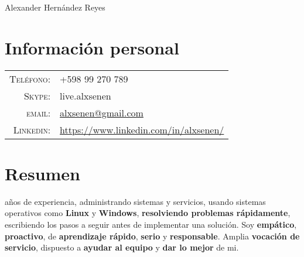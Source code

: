 \documentclass[a4paper,10pt]{article}
\begin{document}
\vspace*{-0.5cm}

\pagestyle{empty} %

{\huge Alexander Hern\'andez Reyes}
\hfill
{}\\
\section{Informaci\'on personal}
\begin{tabular}{rl}
    \textsc{Tel\'efono:}     & +598 99 270 789 \\
    \textsc{Skype:}     & live.alxsenen \\
    \textsc{email:}     & \href{mailto:alxsenen@gmail.com}{alxsenen@gmail.com} \\
    \textsc{Linkedin:}     & \href{https://www.linkedin.com/in/alxsenen/}{https://www.linkedin.com/in/alxsenen/}
\end{tabular}

\section{Resumen}
 a\~{n}os de experiencia, administrando sistemas y servicios, usando sistemas operativos como  \textbf{Linux} y \textbf{Windows}, \textbf{resolviendo problemas r\'apidamente}, escribiendo los pasos a seguir antes de implementar una soluci\'on. Soy \textbf{emp\'atico}, \textbf{proactivo}, de \textbf{aprendizaje r\'apido}, \textbf{serio} y \textbf{responsable}. Amplia \textbf{vocaci\'on de servicio}, dispuesto a \textbf{ayudar al equipo} y \textbf{dar lo mejor} de mi.

\end{document}
